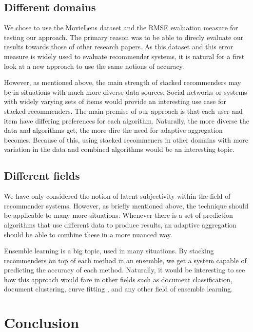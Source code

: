 \subsection{Different domains}

We chose to use the MovieLens dataset and the RMSE evaluation measure for testing our approach.
The primary reason was to be able to direcly evaluate our results towards those of other research papers.
As this dataset and this error measure is widely used to evaluate recommender systems,
it is natural for a first look at a new approach to use the same notions of accuracy.

However, as mentioned above, the main strength of stacked recommenders may be
in situations with much more diverse data sources. Social networks or systems
with widely varying sets of items would provide an interesting use case for stacked recommenders.
The main premise of our approach is that each user and item have differing preferences
for each algorithm. Naturally, the more diverse the data and algorithms get,
the more dire the need for adaptive aggregation becomes.
Because of this, using stacked recommeners in other domains with more variation 
in the data and combined algorithms would be an interesting topic.


\subsection{Different fields}

We have only considered the notion of latent subjectivity within the field of recommender systems.
However, as briefly mentioned above, the technique should be applicable to many more situations.
Whenever there is a set of prediction algorithms that use different data to produce results,
an adaptive aggregation should be able to combine these in a more nuanced way.

Ensemble learning is a big topic, used in many situations.
By stacking recommenders on top of each method in an ensemble, 
we get a system capable of predicting the accuracy of each method.
Naturally, it would be interesting to see how this approach would fare
in other fields such as document classification, document clustering,
curve fitting \cite[p7]{Polikar2006}, and any other field of ensemble learning.


\section{Conclusion}      


